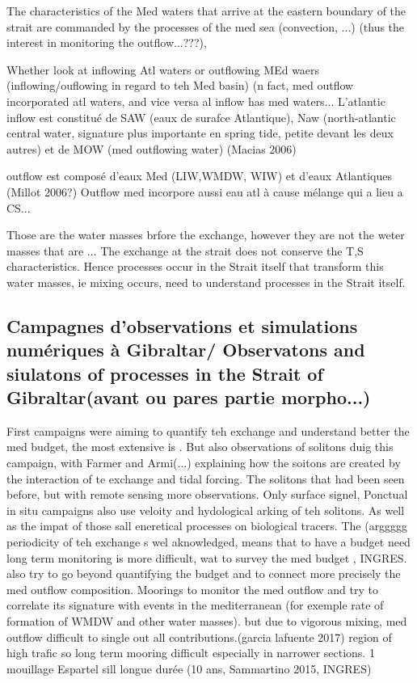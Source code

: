 The characteristics of the Med waters that arrive at the eastern boundary of the strait are commanded by the processes of the med sea (convection, ...) (thus the interest in monitoring the outflow...???),  


Whether look at inflowing Atl waters or outflowing MEd waers (inflowing/ouflowing in regard to teh Med basin) (n fact, med outflow incorporated atl waters, and vice versa al inflow has med waters...
L’atlantic inflow est constitué de SAW (eaux de surafce Atlantique), Naw (north-atlantic central water, signature plus importante en spring tide, petite devant les deux autres) et de MOW (med outflowing water) (Macias 2006)

outflow est composé d’eaux Med (LIW,WMDW, WIW) et d’eaux Atlantiques (Millot 2006?)
Outflow med incorpore aussi eau atl à cause mélange qui a lieu a CS...

Those are the water masses brfore the exchange, however they are not the weter masses that are ... The exchange at the strait does not conserve the T,S characteristics. Hence processes occur in the Strait itself that transform this water masses, ie mixing occurs, need to understand processes in the Strait itself.

\subsection{Campagnes d'observations et simulations numériques à Gibraltar/ Observatons and siulatons of processes in the Strait of Gibraltar(avant ou pares partie morpho...)}

First campaigns were aiming to quantify teh exchange and understand better the med budget, the most extensive is  . But also observations of solitons duig this campaign, with Farmer and Armi(...) explaining how the soitons are created by the interaction of te exchange and tidal forcing. The solitons that had been seen before, but with remote sensing more observations. Only surface signel, Ponctual in situ campaigns also use veloity and hydological arking of teh solitons. As well as the impat of those sall eneretical processes on biological tracers.
The (arggggg periodicity of teh exchange s wel aknowledged, means that to have a budget need long term monitoring is more difficult, wat to survey the med budget , INGRES. also try to go beyond quantifying the budget and to connect more precisely the med outflow composition.
Moorings to monitor the med outflow and try to correlate its signature with events in the mediterranean (for exemple rate of formation of WMDW and other water masses). but due to vigorous mixing, med outflow difficult to single out all contributions.(garcia lafuente 2017) region of high trafic so long term mooring difficult especially in narrower sections. 1 mouillage Espartel sill longue durée (10 ans, Sammartino 2015, INGRES)

